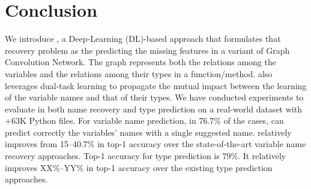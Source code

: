 \section{Conclusion}
\label{sec:conclusion}

We introduce {\tool}, a Deep-Learning (DL)-based approach that
formulates that recovery problem as the predicting the missing
features in a variant of Graph Convolution Network. The graph
represents both the relations among the variables and the relations
among their types in a function/method. {\tool} also leverages
dual-task learning to propagate the mutual impact between the learning
of the variable names and that of their types. We have conducted
experiments to evaluate {\tool} in both name recovery and type
prediction on a real-world dataset with +63K Python files. For
variable name prediction, in 76.7\% of the cases, {\tool} can predict
correctly the variables' names with a single suggested name. {\tool}
relatively improves from 15--40.7\% in top-1 accuracy over the
state-of-the-art variable name recovery approaches. Top-1 accuracy for
type prediction is 79\%. It relatively improves XX\%--YY\% in top-1
accuracy over the existing type prediction approaches.
